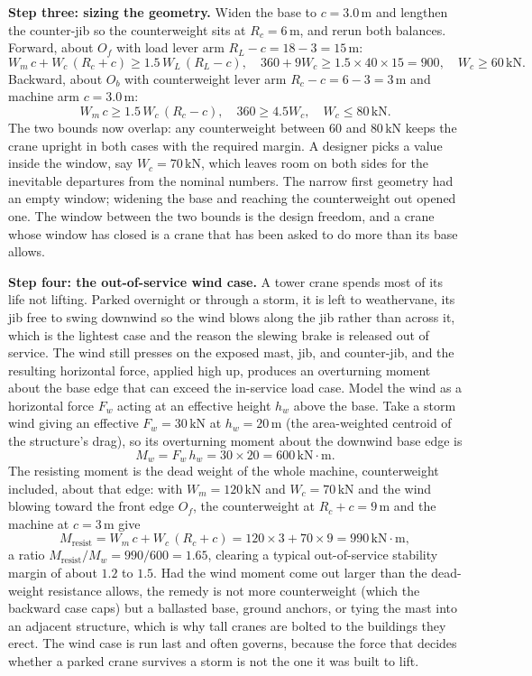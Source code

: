 \textbf{Step three: sizing the geometry.} Widen the base to $c = 3.0\,\si{
\meter}$ and lengthen the counter-jib so the counterweight sits at $R_c = 6\,
\si{\meter}$, and rerun both balances. Forward, about $O_f$ with load lever arm
$R_L - c = 18 - 3 = 15\,\si{\meter}$:
\[
W_m\,c + W_c\,(R_c + c) \ge 1.5\,W_L\,(R_L - c),
\quad
360 + 9 W_c \ge 1.5 \times 40 \times 15 = 900,
\quad
W_c \ge 60\,\text{kN}.
\]
Backward, about $O_b$ with counterweight lever arm $R_c - c = 6 - 3 = 3\,\si{
\meter}$ and machine arm $c = 3.0\,\si{\meter}$:
\[
W_m\,c \ge 1.5\,W_c\,(R_c - c),
\quad
360 \ge 4.5 W_c,
\quad
W_c \le 80\,\text{kN}.
\]
The two bounds now overlap: any counterweight between $60$ and $80\,\text{kN}$
keeps the crane upright in both cases with the required margin. A designer
picks a value inside the window, say $W_c = 70\,\text{kN}$, which leaves room
on both sides for the inevitable departures from the nominal numbers. The
narrow first geometry had an empty window; widening the base and reaching the
counterweight out opened one. The window between the two bounds is the design
freedom, and a crane whose window has closed is a crane that has been asked to
do more than its base allows.

\textbf{Step four: the out-of-service wind case.} A tower crane spends most of
its life not lifting. Parked overnight or through a storm, it is left to
weathervane, its jib free to swing downwind so the wind blows along the jib
rather than across it, which is the lightest case and the reason the slewing
brake is released out of service. The wind still presses on the exposed mast,
jib, and counter-jib, and the resulting horizontal force, applied high up,
produces an overturning moment about the base edge that can exceed the
in-service load case. Model the wind as a horizontal force $F_w$ acting at an
effective height $h_w$ above the base. Take a storm wind giving an effective
$F_w = 30\,\text{kN}$ at $h_w = 20\,\si{\meter}$ (the area-weighted centroid of
the structure's drag), so its overturning moment about the downwind base edge
is
\[
M_{w} = F_w\,h_w = 30 \times 20 = 600\,\text{kN}\cdot\text{m}.
\]
The resisting moment is the dead weight of the whole machine, counterweight
included, about that edge: with $W_m = 120\,\text{kN}$ and $W_c = 70\,\text{kN}$
and the wind blowing toward the front edge $O_f$, the counterweight at $R_c +
c = 9\,\si{\meter}$ and the machine at $c = 3\,\si{\meter}$ give
\[
M_{\text{resist}} = W_m\,c + W_c\,(R_c + c) = 120 \times 3 + 70 \times 9 = 990\,
\text{kN}\cdot\text{m},
\]
a ratio $M_{\text{resist}}/M_w = 990/600 = 1.65$, clearing a typical
out-of-service stability margin of about $1.2$ to $1.5$. Had the wind moment
come out larger than the dead-weight resistance allows, the remedy is not more
counterweight (which the backward case caps) but a ballasted base, ground
anchors, or tying the mast into an adjacent structure, which is why tall cranes
are bolted to the buildings they erect. The wind case is run last and often
governs, because the force that decides whether a parked crane survives a storm
is not the one it was built to lift.


